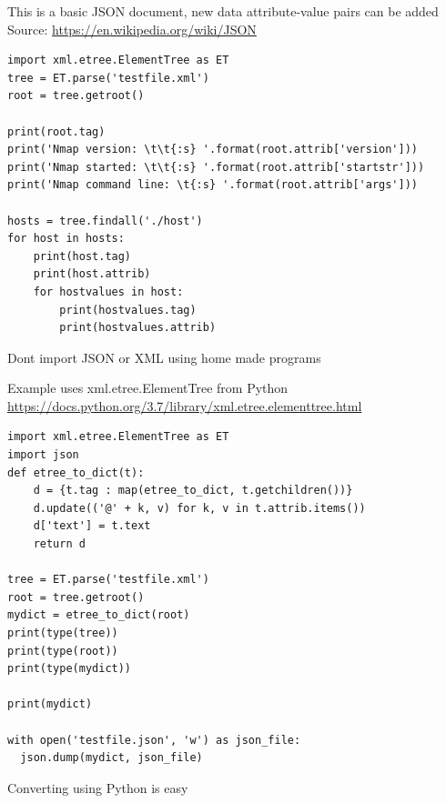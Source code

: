 \documentclass[Screen16to9,17pt]{foils}
\begin{document}
\begin{list2}
\item This is a basic JSON document, new data attribute-value pairs can be added\\
Source: \url{https://en.wikipedia.org/wiki/JSON}
\end{list2}




\begin{verbatim}
import xml.etree.ElementTree as ET
tree = ET.parse('testfile.xml')
root = tree.getroot()

print(root.tag)
print('Nmap version: \t\t{:s} '.format(root.attrib['version']))
print('Nmap started: \t\t{:s} '.format(root.attrib['startstr']))
print('Nmap command line: \t{:s} '.format(root.attrib['args']))

hosts = tree.findall('./host')
for host in hosts:
    print(host.tag)
    print(host.attrib)
    for hostvalues in host:
        print(hostvalues.tag)
        print(hostvalues.attrib)
\end{verbatim}

\begin{list2}
\item Dont import JSON or XML using home made programs
\item Example uses xml.etree.ElementTree from Python\\
\url{https://docs.python.org/3.7/library/xml.etree.elementtree.html}
\end{list2}


\begin{verbatim}
import xml.etree.ElementTree as ET
import json
def etree_to_dict(t):
    d = {t.tag : map(etree_to_dict, t.getchildren())}
    d.update(('@' + k, v) for k, v in t.attrib.items())
    d['text'] = t.text
    return d

tree = ET.parse('testfile.xml')
root = tree.getroot()
mydict = etree_to_dict(root)
print(type(tree))
print(type(root))
print(type(mydict))

print(mydict)

with open('testfile.json', 'w') as json_file:
  json.dump(mydict, json_file)
\end{verbatim}

Converting using Python is easy
\end{document}
